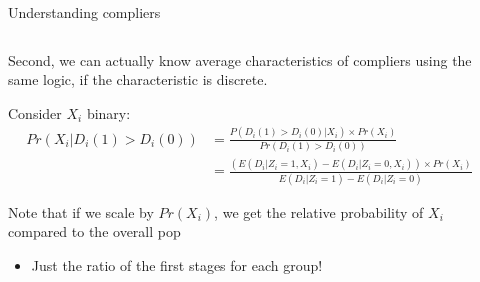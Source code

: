 \documentclass[notes,11pt, aspectratio=169]{beamer}
\newenvironment{wideitemize}{\itemize\addtolength{\itemsep}{10pt}}{\enditemize}
\begin{document}
\begin{frame}{Understanding compliers}
  \begin{columns}[T] %
    \begin{column}{0.7\textwidth}
      \begin{wideitemize}
      \item Second, we can actually know average characteristics of
        compliers using the same logic, if the characteristic is
        discrete.
      \item Consider $X_{i}$ binary:
        \begin{align*}
          Pr(X_{i} | D_{i}(1) > D_{i}(0)) &= \frac{P(D_{i}(1) > D_{i}(0) | X_{i}) \times Pr(X_{i})}{Pr(D_{i}(1) > D_{i}(0))}\\
          &= \frac{\left(E(D_{i} | Z_{i} = 1, X_{i}) - E(D_{i} | Z_{i} = 0, X_{i})\right) \times Pr(X_{i})}{E(D_{i} | Z_{i} = 1) - E(D_{i} | Z_{i} = 0)}
        \end{align*}
      \item Note that if we scale by $Pr(X_{i})$, we get the relative
        probability of $X_{i}$ compared to the overall pop
        \begin{itemize}
        \item Just the ratio of the first stages for each group!
        \end{itemize}
      \end{wideitemize}
\end{column}
\begin{column}{0.3\textwidth}
\end{column}
\end{columns}

  
\end{frame}
\end{document}
